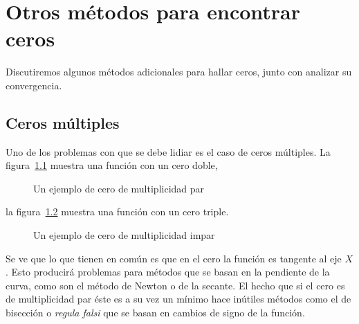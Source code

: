 

\chapter{Otros métodos para encontrar ceros}
\label{cha:otros-metodos-ceros}

  Discutiremos algunos métodos adicionales para hallar ceros,
  junto con analizar su convergencia.

\section{Ceros múltiples}
\label{sec:multiple-zeros}

  Uno de los problemas con que se debe lidiar
  es el caso de ceros múltiples.
  La figura~\ref{fig:multiple-zero-even}
  muestra una función con un cero doble,
  \begin{figure}[ht]
    \centering
    \caption{Un ejemplo de cero de multiplicidad par}
    \label{fig:multiple-zero-even}
  \end{figure}
  la figura~\ref{fig:multiple-zero-odd}
  muestra una función con un cero triple.
  \begin{figure}[ht]
    \centering
    \caption{Un ejemplo de cero de multiplicidad impar}
    \label{fig:multiple-zero-odd}
  \end{figure}
  Se ve que lo que tienen en común
  es que en el cero la función es tangente al eje \(X\).
  Esto producirá problemas
  para métodos que se basan en la pendiente de la curva,
  como son el método de Newton o de la secante.
  El hecho que si el cero es de multiplicidad par
  éste es a su vez un mínimo
  hace inútiles métodos como el de bisección
  o \emph{\foreignlanguage{latin}{regula falsi}}
  que se basan en cambios de signo de la función.

